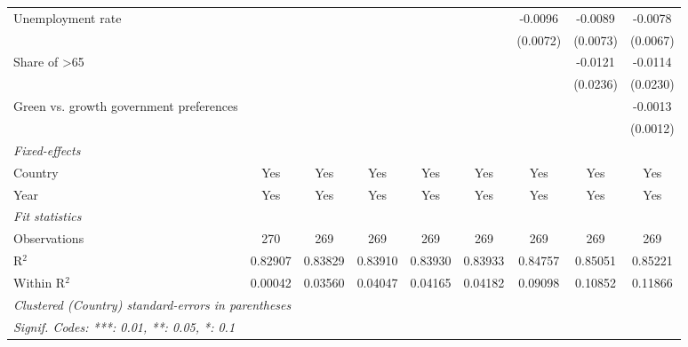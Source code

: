 \begin{table}[htbp]
\begin{tabular}{lcccccccc}
      Unemployment rate                                              &          &          &          &          &          & -0.0096  & -0.0089  & -0.0078\\   
                                                                     &          &          &          &          &          & (0.0072) & (0.0073) & (0.0067)\\   
      Share of >65                                                   &          &          &          &          &          &          & -0.0121  & -0.0114\\   
                                                                     &          &          &          &          &          &          & (0.0236) & (0.0230)\\   
      Green vs. growth government preferences                        &          &          &          &          &          &          &          & -0.0013\\   
                                                                     &          &          &          &          &          &          &          & (0.0012)\\   
      \midrule
      \emph{Fixed-effects}\\
      Country                                                        & Yes      & Yes      & Yes      & Yes      & Yes      & Yes      & Yes      & Yes\\  
      Year                                                           & Yes      & Yes      & Yes      & Yes      & Yes      & Yes      & Yes      & Yes\\  
      \midrule
      \emph{Fit statistics}\\
      Observations                                                   & 270      & 269      & 269      & 269      & 269      & 269      & 269      & 269\\  
      R$^2$                                                          & 0.82907  & 0.83829  & 0.83910  & 0.83930  & 0.83933  & 0.84757  & 0.85051  & 0.85221\\  
      Within R$^2$                                                   & 0.00042  & 0.03560  & 0.04047  & 0.04165  & 0.04182  & 0.09098  & 0.10852  & 0.11866\\  
      \midrule \midrule
      \multicolumn{9}{l}{\emph{Clustered (Country) standard-errors in parentheses}}\\
      \multicolumn{9}{l}{\emph{Signif. Codes: ***: 0.01, **: 0.05, *: 0.1}}\\
   \end{tabular}
\end{table}


